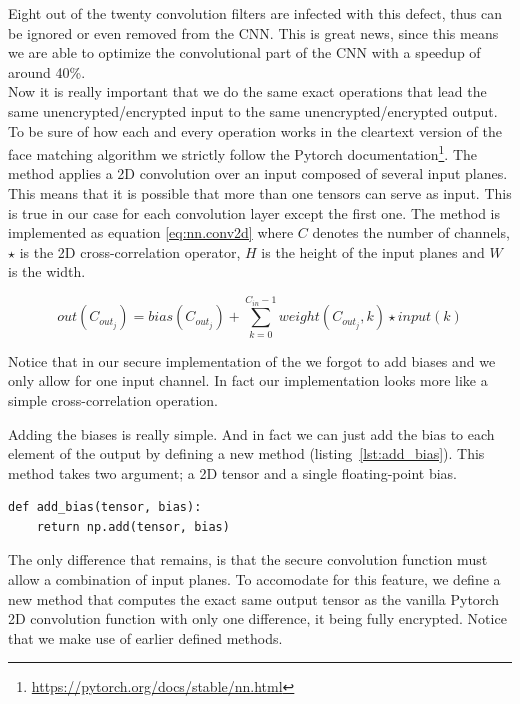 Eight out of the twenty convolution filters are infected with this defect, thus can be ignored or even removed from the CNN. This is great news, since this means we are able to optimize the convolutional part of the CNN with a speedup of around 40\%.\\

Now it is really important that we do the same exact operations that lead the same unencrypted/encrypted input to the same unencrypted/encrypted output. To be sure of how each and every operation works in the cleartext version of the face matching algorithm we strictly follow the Pytorch documentation\footnote{\url{https://pytorch.org/docs/stable/nn.html}}. The  method applies a 2D convolution over an input composed of several input planes. This means that it is possible that more than one tensors can serve as input. This is true in our case for each convolution layer except the first one. The method is implemented as equation \ref{eq:nn.conv2d} where $C$ denotes the number of channels, $\star$ is the 2D cross-correlation operator, $H$ is the height of the input planes and $W$ is the width.

\begin{equation} \label{eq:nn.conv2d}
  out(C_{out_j}) = bias(C_{out_j}) + \sum_{k=0}^{C_{in}-1}weight(C_{out_j},k) \star input(k)
\end{equation}

Notice that in our secure implementation of the  we forgot to add biases and we only allow for one input channel. In fact our implementation looks more like a simple cross-correlation operation.

Adding the biases is really simple. And in fact we can just add the bias to each element of the output by defining a new method  (listing~\ref{lst:add_bias}). This method takes two argument; a 2D tensor and a single floating-point bias.

\begin{lstlisting}[caption={Code for adding bias to matrix}, label={lst:add_bias}, frame=single, breaklines=true]
def add_bias(tensor, bias):
    return np.add(tensor, bias)
\end{lstlisting}

The only difference that remains, is that the secure convolution function must allow a combination of input planes. To accomodate for this feature, we define a new method  that computes the exact same output tensor as the vanilla Pytorch 2D convolution function with only one difference, it being fully encrypted. Notice that we make use of earlier defined methods.


